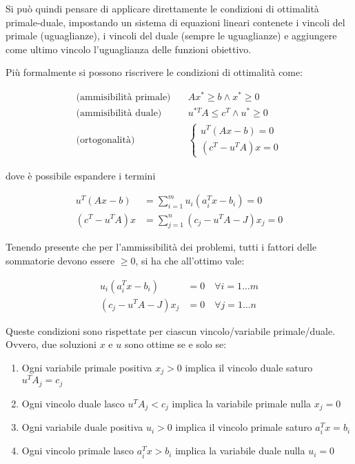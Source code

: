 Si può quindi pensare di applicare direttamente le condizioni di ottimalità primale-duale, impostando un sistema di equazioni lineari contenete i vincoli del primale (uguaglianze), i vincoli del duale (sempre le uguaglianze) e aggiungere come ultimo vincolo l'uguaglianza delle funzioni obiettivo.

Più formalmente si possono riscrivere le condizioni di ottimalità come:

\begin{align*}
	\text{(ammisibilità primale)}\quad&Ax^* \geq b \wedge x^* \geq 0 \\
	\text{(ammisibilità duale)}\quad&u^{*T}A \leq c^T \wedge u^* \geq 0 \\
	\text{(ortogonalità)}\quad&\begin{cases}
	u^T(Ax -b) = 0 \\
	(c^T - u^T A) x = 0
	\end{cases}
\end{align*}

dove è possibile espandere i termini

\begin{align*}
	u^T(Ax -b) &= \sum\limits_{i=1}^{m} u_i (a_{i}^Tx -b_i) = 0\\
	(c^T - u^T A) x &=\sum\limits_{j=1}^{n} (c_j - u^TA-J)x_j = 0
\end{align*}

Tenendo presente che per l'ammissibilità dei problemi, tutti i fattori delle sommatorie devono essere $\geq 0$, si ha che all'ottimo vale:

\begin{align*}
u_i (a_{i}^Tx -b_i) &= 0 \quad \forall i = 1 \ldots m\\
(c_j - u^TA-J)x_j   &= 0\quad \forall j = 1 \ldots n
\end{align*}

Queste condizioni sono rispettate per ciascun vincolo/variabile primale/duale.
Ovvero, due soluzioni $x$ e $u$ sono ottime se e solo se:

\begin{enumerate}
	\item Ogni variabile primale positiva $x_j > 0$ implica il vincolo duale saturo $u^TA_j = c_j$
	\item Ogni vincolo duale lasco $u^TA_j < c_j$ implica la variabile primale nulla $x_j = 0$
	\item Ogni variabile duale positiva $u_i > 0$ implica il vincolo primale saturo $a_{i}^Tx = b_i$
	\item Ogni vincolo primale lasco $a_{i}^Tx > b_i$ implica la variabile duale nulla $u_i = 0$
\end{enumerate}

